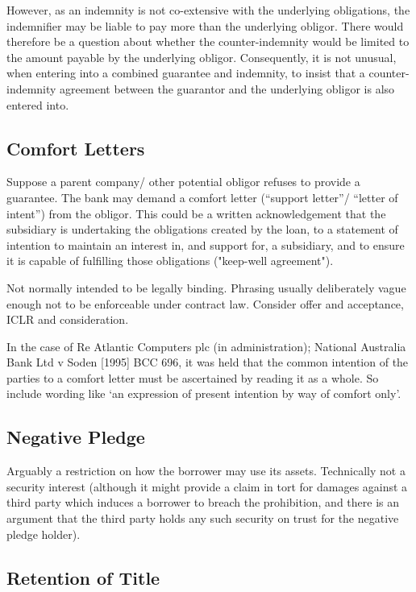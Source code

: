 \documentclass[
]{article}
\begin{document}
However, as an indemnity is not co-extensive with the underlying
obligations, the indemnifier may be liable to pay more than the
underlying obligor. There would therefore be a question about whether
the counter-indemnity would be limited to the amount payable by the
underlying obligor. Consequently, it is not unusual, when entering into
a combined guarantee and indemnity, to insist that a counter-indemnity
agreement between the guarantor and the underlying obligor is also
entered into.

\hypertarget{comfort-letters}{%
\subsection{Comfort Letters}\label{comfort-letters}}

Suppose a parent company/ other potential obligor refuses to provide a
guarantee. The bank may demand a comfort letter (``support letter''/
``letter of intent'') from the obligor. This could be a written
acknowledgement that the subsidiary is undertaking the obligations
created by the loan, to a statement of intention to maintain an interest
in, and support for, a subsidiary, and to ensure it is capable of
fulfilling those obligations ("keep-well agreement").

Not normally intended to be legally binding. Phrasing usually
deliberately vague enough not to be enforceable under contract law.
Consider offer and acceptance, ICLR and consideration.

In the case of Re Atlantic Computers plc (in administration); National
Australia Bank Ltd v Soden {[}1995{]} BCC 696, it was held that the
common intention of the parties to a comfort letter must be ascertained
by reading it as a whole. So include wording like `an expression of
present intention by way of comfort only'.

\hypertarget{negative-pledge}{%
\subsection{Negative Pledge}\label{negative-pledge}}

Arguably a restriction on how the borrower may use its assets.
Technically not a security interest (although it might provide a claim
in tort for damages against a third party which induces a borrower to
breach the prohibition, and there is an argument that the third party
holds any such security on trust for the negative pledge holder).

\hypertarget{retention-of-title}{%
\subsection{Retention of Title}\label{retention-of-title}}
\end{document}
